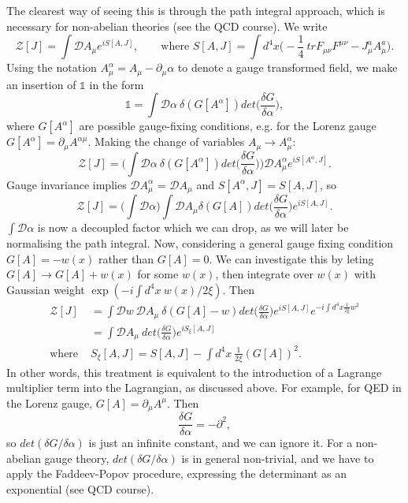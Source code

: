 \documentclass[a4paper,12pt]{article}
\begin{document}
The clearest way of seeing this is through the path integral approach, which is necessary for non-abelian theories (see the QCD course). We write 
\begin{equation}
\mathcal{Z}[J] = \int\mathcal{D} A_\mu e^{iS[A,J]}, \qquad \text{where } S[A,J] = \int d^4x \bigg(-\frac{1}{4}\ tr F_{\mu \nu}F^{\mu \nu} - J_\mu^a A_\mu^a \bigg).
\end{equation}
Using the notation $A_\mu^\alpha = A_\mu - \partial_\mu \alpha$ to denote a gauge transformed field, we make an insertion of $\mathds{1}$ in the form
\begin{equation}
\mathds{1} = \int \mathcal{D}\alpha\ \delta ( G[A^\alpha]) det\bigg(\frac{\delta G}{\delta \alpha} \bigg),
\end{equation}
where $G[A^\alpha]$ are possible gauge-fixing conditions, e.g. for the Lorenz gauge $G[A^\alpha] = \partial_\mu A^{\alpha \mu}$. Making the change of variables $A_\mu \to A_\mu^\alpha$:
\begin{equation}
\mathcal{Z}[J] = \bigg( \int \mathcal{D}\alpha\ \delta ( G[A^\alpha]) det\bigg(\frac{\delta G}{\delta \alpha} \bigg)\bigg) \mathcal{D}A^\alpha_\mu e^{i S[A^\alpha,J]}.
\end{equation}
Gauge invariance implies $\mathcal{D}A_\mu^\alpha$ = $\mathcal{D}A_\mu$ and $S[A^\alpha, J] = S[A,J]$, so
\begin{equation}
\mathcal{Z}[J] = \bigg( \int \mathcal{D} \alpha \bigg) \int \mathcal{D} A_\mu \delta(G[A]) det \bigg(\frac{\delta G}{\delta \alpha} \bigg) e^{iS[A,J]}.
\end{equation}
$\int \mathcal{D} \alpha$ is now a decoupled factor which we can drop, as we will later be normalising the path integral. Now, considering a general gauge fixing condition $G[A] = -w(x)$ rather than $G[A] = 0$. We can investigate this by leting $G[A] \to G[A] + w(x)$ for some $w(x)$, then integrate over $w(x)$ with Gaussian weight $\exp(-i\int d^4x \ w(x)/2\xi)$. Then
\begin{equation}
\begin{split}
\mathcal{Z}[J] &= \int \mathcal{D} w\ \mathcal{D} A_\mu \ \delta(G[A] - w) det \bigg(\frac{\delta G}{\delta \alpha}\bigg) e^{i S [A,J]} e^{-i \int d^4x \frac{1}{2\xi}w^2} \\
&= \int \mathcal{D} A_\mu\ det\bigg(\frac{\delta G}{\delta \alpha}\bigg) e^{iS_\xi [A,J]} \\
\text{where } &S_\xi[A,J] = S[A,J] - \int d^4x\ \frac{1}{2\xi} (G[A])^2.
\end{split}
\end{equation}
In other words, this treatment is equivalent to the introduction of a Lagrange multiplier term into the Lagrangian, as discussed above.
For example, for QED in the Lorenz gauge, $G[A] = \partial_\mu A^\mu$. Then 
\begin{equation}
\frac{\delta G}{\delta \alpha} = -\partial^2,
\end{equation}
so $det(\delta G/\delta \alpha)$ is just an infinite constant, and we can ignore it. For a non-abelian gauge theory, $det(\delta G/\delta \alpha)$ is in general non-trivial, and we have to apply the Faddeev-Popov procedure, expressing the determinant as an exponential (see QCD course).
\end{document}
